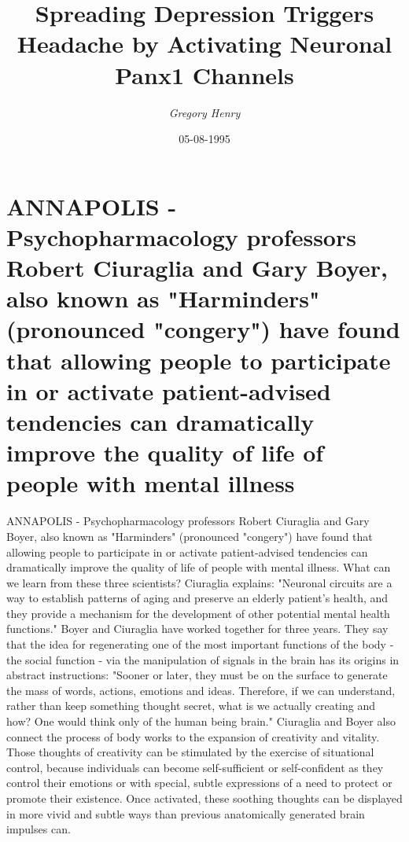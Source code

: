 \documentclass{article}%
\title{Spreading Depression Triggers Headache by Activating Neuronal Panx1 Channels}%
\author{\textit{Gregory Henry}}%
\date{05-08-1995}%
\begin{document}
%
\normalsize%
\maketitle%
\section{ANNAPOLIS {-} Psychopharmacology professors Robert Ciuraglia and Gary Boyer, also known as "Harminders" (pronounced "congery") have found that allowing people to participate in or activate patient{-}advised tendencies can dramatically improve the quality of life of people with mental illness}%
\label{sec:ANNAPOLIS{-}PsychopharmacologyprofessorsRobertCiuragliaandGaryBoyer,alsoknownasHarminders(pronouncedcongery)havefoundthatallowingpeopletoparticipateinoractivatepatient{-}advisedtendenciescandramaticallyimprovethequalityoflifeofpeoplewithmentalillness}%
ANNAPOLIS {-} Psychopharmacology professors Robert Ciuraglia and Gary Boyer, also known as "Harminders" (pronounced "congery") have found that allowing people to participate in or activate patient{-}advised tendencies can dramatically improve the quality of life of people with mental illness. What can we learn from these three scientists?\newline%
Ciuraglia explains: "Neuronal circuits are a way to establish patterns of aging and preserve an elderly patient's health, and they provide a mechanism for the development of other potential mental health functions."\newline%
Boyer and Ciuraglia have worked together for three years. They say that the idea for regenerating one of the most important functions of the body {-} the social function {-} via the manipulation of signals in the brain has its origins in abstract instructions: "Sooner or later, they must be on the surface to generate the mass of words, actions, emotions and ideas. Therefore, if we can understand, rather than keep something thought secret, what is we actually creating and how? One would think only of the human being brain."\newline%
Ciuraglia and Boyer also connect the process of body works to the expansion of creativity and vitality.\newline%
Those thoughts of creativity can be stimulated by the exercise of situational control, because individuals can become self{-}sufficient or self{-}confident as they control their emotions or with special, subtle expressions of a need to protect or promote their existence. Once activated, these soothing thoughts can be displayed in more vivid and subtle ways than previous anatomically generated brain impulses can.\newline%
\end{document}
